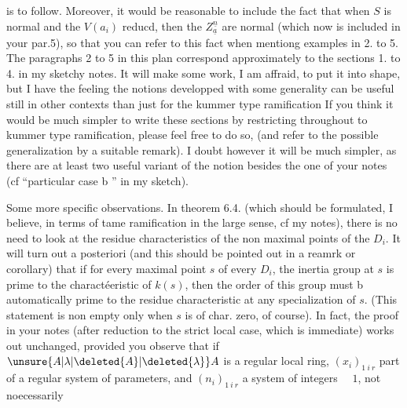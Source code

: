 is to follow. Moreover, it would be reasonable to include the fact that when
$S$ is normal and the $V(a_i)$ reducd,
then the $Z^{\underline{n}}_{\underline{a}}$ are normal (which now is included
in your par.5), so that you can refer to this fact when
mentiong
examples in  2. to 5. The paragraphs 2 to 5
in this plan correspond approximately to the sections 1. to 4. in my sketchy
notes. It will make some work, I am affraid, to put it into shape, but I have
the feeling the notions developped with some generality can be useful still
in other contexts than just for the kummer type ramification %
If you think it would be much simpler to write these sections by restricting
throughout to kummer type ramification, please feel free to do so, (and refer
to the possible generalization by a suitable remark). I doubt however it will
be much simpler, as there are at least two useful variant %
of the notion besides the one of your notes (cf ``particular case b '' in my
sketch).

Some more specific observations. In theorem 6.4. (which should be formulated,
I believe, in terms of tame ramification in the large sense, cf my notes),
there is no need to look at the residue characteristics of the non maximal
points of the $D_i$. It will turn out a posteriori (and this should be pointed
out in a reamrk or corollary) that  if for every maximal point $s$
of every $D_i$, the inertia group at $s$ is prime
to the charactéeristic of $k(s)$, then the order of this group must
b automatically prime to the residue
characteristic at any specialization of $s$. (This statement is non empty only
when $s$ is of char. zero, of course). In fact, the proof in your notes (after
reduction to the strict local case, which is immediate) works out unchanged,
provided you observe that if
$\unsure{A|\lambda|\deleted{A}|\deleted{\lambda}}A$ is a
regular local ring, $(x_i)_{1\ i\ r}$ part of a regular system of parameters,
and $(n_i)_{1\ i\ r}$ a system of integers $\quad1$,
not noecessarily
